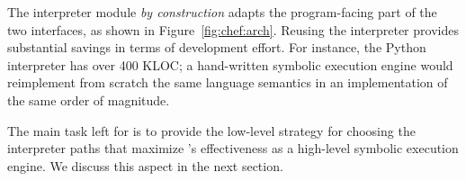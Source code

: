 The interpreter module \emph{by construction} adapts the program-facing part of the two interfaces, as shown in Figure~\ref{fig:chef:arch}.
%
Reusing the interpreter provides substantial savings in terms of development effort.  For instance, the Python interpreter has over 400 KLOC; a hand-written symbolic execution engine would reimplement from scratch the same language semantics in an implementation of the same order of magnitude.

The main task left for \chef is to provide the low-level strategy for choosing the interpreter paths that maximize \chef's effectiveness as a high-level symbolic execution engine.
%
We discuss this aspect in the next section.

